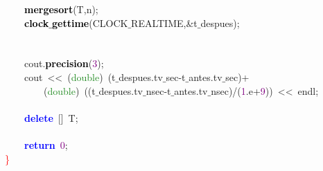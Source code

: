 \mbox{}\ \ \ \ \textbf{\textcolor{Black}{mergesort}}\textcolor{BrickRed}{(}T\textcolor{BrickRed}{,}n\textcolor{BrickRed}{);} \\
\mbox{}\ \ \ \ \textbf{\textcolor{Black}{clock$\_$gettime}}\textcolor{BrickRed}{(}CLOCK$\_$REALTIME\textcolor{BrickRed}{,\&}t$\_$despues\textcolor{BrickRed}{);} \\
\mbox{}\ \ \ \  \\
\mbox{}\ \ \ \  \\
\mbox{}\ \ \ \ cout\textcolor{BrickRed}{.}\textbf{\textcolor{Black}{precision}}\textcolor{BrickRed}{(}\textcolor{Purple}{3}\textcolor{BrickRed}{);} \\
\mbox{}\ \ \ \ cout\ \textcolor{BrickRed}{\textless{}\textless{}}\ \textcolor{BrickRed}{(}\textcolor{ForestGreen}{double}\textcolor{BrickRed}{)}\ \textcolor{BrickRed}{(}t$\_$despues\textcolor{BrickRed}{.}tv$\_$sec\textcolor{BrickRed}{-}t$\_$antes\textcolor{BrickRed}{.}tv$\_$sec\textcolor{BrickRed}{)+} \\
\mbox{}\ \ \ \ \ \ \ \ \textcolor{BrickRed}{(}\textcolor{ForestGreen}{double}\textcolor{BrickRed}{)}\ \textcolor{BrickRed}{((}t$\_$despues\textcolor{BrickRed}{.}tv$\_$nsec\textcolor{BrickRed}{-}t$\_$antes\textcolor{BrickRed}{.}tv$\_$nsec\textcolor{BrickRed}{)/(}\textcolor{Purple}{1}\textcolor{BrickRed}{.}e\textcolor{BrickRed}{+}\textcolor{Purple}{9}\textcolor{BrickRed}{))}\ \textcolor{BrickRed}{\textless{}\textless{}}\ endl\textcolor{BrickRed}{;} \\
\mbox{} \\
\mbox{}\ \ \ \ \textbf{\textcolor{Blue}{delete}}\ \textcolor{BrickRed}{[]}\ T\textcolor{BrickRed}{;} \\
\mbox{}\ \ \ \  \\
\mbox{}\ \ \ \ \textbf{\textcolor{Blue}{return}}\ \textcolor{Purple}{0}\textcolor{BrickRed}{;} \\
\mbox{}\textcolor{Red}{\}} \\
\mbox{}
